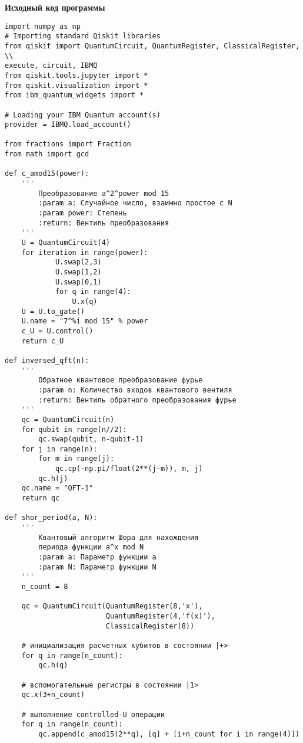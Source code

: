 
\begin{center}
\textbf{Исходный код программы}
\end{center}

\begin{verbatim}
import numpy as np
# Importing standard Qiskit libraries
from qiskit import QuantumCircuit, QuantumRegister, ClassicalRegister, \\
execute, circuit, IBMQ
from qiskit.tools.jupyter import *
from qiskit.visualization import *
from ibm_quantum_widgets import *

# Loading your IBM Quantum account(s)
provider = IBMQ.load_account()

from fractions import Fraction
from math import gcd

def c_amod15(power):
    '''
        Преобразование a^2^power mod 15
        :param a: Случайное число, взаимно простое с N
        :param power: Степень
        :return: Вентиль преобразования
    '''
    U = QuantumCircuit(4)
    for iteration in range(power):
            U.swap(2,3)
            U.swap(1,2)
            U.swap(0,1)
            for q in range(4):
                U.x(q)
    U = U.to_gate()
    U.name = "7^%i mod 15" % power
    c_U = U.control()
    return c_U

def inversed_qft(n):
    '''
        Обратное квантовое преобразование фурье
        :param n: Количество входов квантового вентиля
        :return: Вентиль обратного преобразования фурье
    '''
    qc = QuantumCircuit(n)
    for qubit in range(n//2):
        qc.swap(qubit, n-qubit-1)
    for j in range(n):
        for m in range(j):
            qc.cp(-np.pi/float(2**(j-m)), m, j)
        qc.h(j)
    qc.name = "QFT-1"
    return qc

def shor_period(a, N):
    '''
        Квантовый алгоритм Шора для нахождения
        периода функции a^x mod N
        :param a: Параметр функции a
        :param N: Параметр функции N
    '''
    n_count = 8

    qc = QuantumCircuit(QuantumRegister(8,'x'),
                        QuantumRegister(4,'f(x)'),
                        ClassicalRegister(8))

    # инициализация расчетных кубитов в состоянии |+>
    for q in range(n_count):
        qc.h(q)

    # вспомогательные регистры в состоянии |1>
    qc.x(3+n_count)

    # выполнение controlled-U операции
    for q in range(n_count):
        qc.append(c_amod15(2**q), [q] + [i+n_count for i in range(4)])


\end{verbatim}
